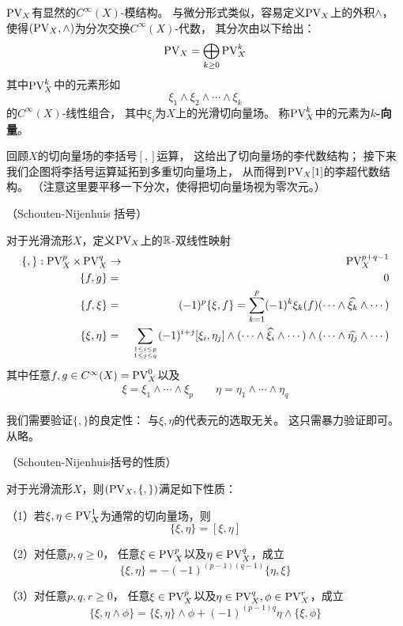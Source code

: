 $\operatorname{PV}_X$有显然的$C^{\infty}(X)$-模结构。
与微分形式类似，容易定义$\operatorname{PV}_X$上的外积$\wedge$，
使得$(\operatorname{PV}_X,\wedge)$为分次交换$C^{\infty}(X)$-代数，
其分次由以下给出：
$$\operatorname{PV}_X=\bigoplus_{k\geq 0}\operatorname{PV}^k_X$$
其中$\operatorname{PV}^k_X$中的元素形如
$$\xi_1\wedge\xi_2\wedge\cdots\wedge\xi_k$$
的$C^{\infty}(X)$-线性组合，
其中$\xi_i$为$X$上的光滑切向量场。
称$\operatorname{PV}^k_X$中的元素为\textbf{$k$-向量}。

回顾$X$的切向量场的李括号$[,]$运算，
这给出了切向量场的李代数结构；
接下来我们企图将李括号运算延拓到多重切向量场上，
从而得到$\operatorname{PV}_X[1]$的李超代数结构。
（注意这里要平移一下分次，使得把切向量场视为零次元。）

\begin{definition}（Schouten-Nijenhuis 括号）

对于光滑流形$X$，定义$\operatorname{PV}_X$上的$\mathbb{R}$-双线性映射
\begin{eqnarray*}
\{,\}:\operatorname{PV}^p_X\times \operatorname{PV}^q_X &\to& \operatorname{PV}^{p+q-1}_X\\
\{f,g\}     &=&0\\
\{f,\xi\}   &=&   (-1)^{p}\{\xi,f\}=
                  \sum_{k=1}^p(-1)^{k}
                  \xi_k(f)(\cdots\wedge\widehat{\xi_k}
                  \wedge\cdots)\\
\{\xi,\eta\}&=& \sum_{1\leq i\leq p\atop 1\leq j\leq q}(-1)^{i+j}
                  [\xi_i,\eta_j]\wedge
                  (\cdots\wedge\widehat{\xi_i}
                  \wedge\cdots)
                  \wedge(\cdots\wedge\widehat{\eta_j}
                  \wedge\cdots)
\end{eqnarray*}
其中任意$f,g\in C^{\infty}(X)=\operatorname{PV}^0_X$以及
\begin{eqnarray*}
\xi=\xi_1\wedge\cdots\wedge\xi_p\quad\quad
\eta=\eta_1\wedge\cdots\wedge\eta_q
\end{eqnarray*}
\end{definition}
我们需要验证$\{,\}$的良定性：
与$\xi,\eta$的代表元的选取无关。
这只需暴力验证即可。从略。

\begin{prop}（Schouten-Nijenhuis括号的性质）

对于光滑流形$X$，则$(\operatorname{PV}_X,\{,\})$满足如下性质：

（1）若$\xi,\eta\in\operatorname{PV}^1_X$为通常的切向量场，则
$$\{\xi,\eta\}=[\xi,\eta]$$

（2）对任意$p,q\geq 0$，
任意$\xi\in\operatorname{PV}^p_X$以及$\eta\in\operatorname{PV}_X^q$，成立
$$\{\xi,\eta\}=-(-1)^{(p-1)(q-1)}\{\eta,\xi\}$$

（3）对任意$p,q,r\geq 0$，
任意$\xi\in\operatorname{PV}^p_X$以及$\eta\in\operatorname{PV}_X^q,\phi\in\operatorname{PV}_X^r$，成立
$$\{\xi,\eta\wedge\phi\}=\{\xi,\eta\}\wedge\phi
+(-1)^{(p-1)q}\eta\wedge\{\xi,\phi\}$$
\label{Schouten-Nijenhuis公理-prop}
\end{prop}

